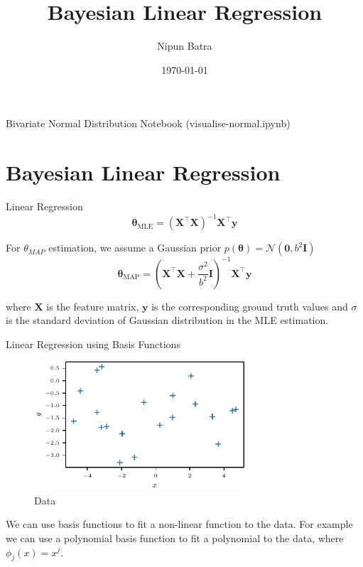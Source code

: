 \documentclass{beamer}
\begin{document}
    


\begin{frame}{Bivariate Normal Distribution}
    Notebook (visualise-normal.ipynb)
\end{frame}

\title{Bayesian Linear Regression}
\author{Nipun Batra}
\date{\today}
\maketitle
{}

\section{Bayesian Linear Regression}

\begin{frame}{Linear Regression}
\begin{equation*}
\boldsymbol{\theta}_{\mathrm{MLE}}=\left(\boldsymbol{X}^{\top} \boldsymbol{X}\right)^{-1} \boldsymbol{X}^{\top} \boldsymbol{y}
\end{equation*}

\pause For $\theta_{MAP}$ estimation, we assume a Gaussian prior $p(\boldsymbol{\theta})=\mathcal{N}\left(\mathbf{0}, b^2 \boldsymbol{I}\right)$\\
\pause \begin{equation*}
\boldsymbol{\theta}_{\mathrm{MAP}}=\left(\boldsymbol{X}^{\top} \boldsymbol{X}+\frac{\sigma^2}{b^2} \boldsymbol{I}\right)^{-1} \boldsymbol{X}^{\top} \boldsymbol{y}
\end{equation*}

\pause where $\boldsymbol{X}$ is the feature matrix, $\boldsymbol{y}$ is the corresponding ground truth values and $\sigma$ is the standard deviation of Gaussian distribution in the MLE estimation. 

\end{frame}

\begin{frame}{Linear Regression using Basis Functions}
    \begin{figure}
        \centering
        \includegraphics[width=0.7\textwidth]{data.pdf}
        \caption{Data}
    \end{figure}
    \pause We can use basis functions to fit a non-linear function to the data.
    \pause For example we can use a polynomial basis function to fit a polynomial to the data, where $\phi_j(x)=x^j$.
\end{frame}
\end{document}
